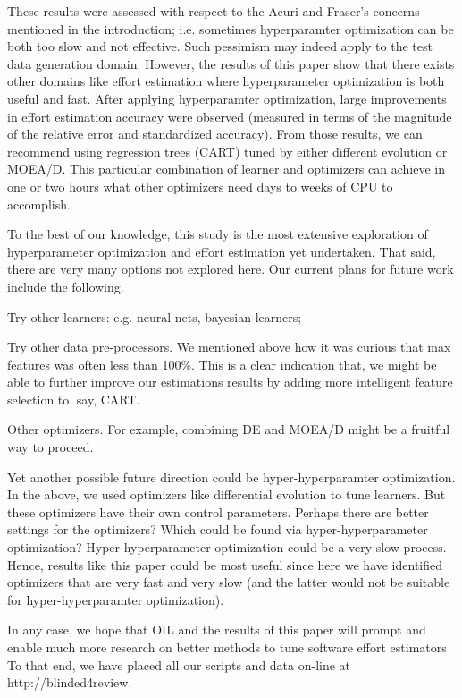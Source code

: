 These results were assessed with respect to the  Acuri and  Fraser's concerns mentioned in the introduction; i.e. sometimes
hyperparamter optimization can be both too slow and not effective.
Such pessimism    may indeed apply  to  the  test  data  generation  domain.
However, 
the results of this paper show that 
 there  exists
other domains like effort estimation where hyperparameter
optimization  is  both
useful
and
fast. After  applying  hyperparamter optimization,  large  improvements  in  effort
estimation  accuracy  were  observed  (measured  in  terms  of  the
magnitude  of  the  relative  error  and  standardized  accuracy).
From those results, we can recommend using regression trees
(CART)  tuned  by  either  different  evolution  or  MOEA/D.  This
particular combination of learner and optimizers can achieve
in  one  or  two  hours  what  other  optimizers  need  days  to  weeks
of  CPU  to  accomplish.

To the best of our knowledge,
this study is the most extensive exploration   of
hyperparameter optimization and effort estimation yet undertaken. That said, there are very many
options not explored here. Our current
plans for future work include the following.
\bi
\item Try other learners:
e.g. neural nets, bayesian learners;
\item Try other data pre-processors.
We mentioned above how it was curious that
max features was often less than 100\%.
This is a clear indication that, we
might be able to further improve our estimations results by adding
more intelligent feature selection to, say, CART.
\item Other optimizers. For example,
combining DE and MOEA/D might be a fruitful way
to proceed.
\item Yet another possible future direction
could be hyper-hyperparamter optimization. In
the above, we used optimizers like differential
evolution to tune learners. But these optimizers
have their own control parameters. Perhaps there 
are better settings for the optimizers? Which could be found via hyper-hyperparameter optimization?
\ei
Hyper-hyperparameter optimization could be a very slow
process. Hence, results like this paper could be
most useful since here we have identified
optimizers that are
very fast and very slow (and the latter would
not be suitable for hyper-hyperparamter optimization).

In any case,
we  hope  that
OIL  and the results of this paper will  prompt  and  enable
much more research on better methods to tune software effort
estimators
To that end, we have placed all our scripts and data   on-line at http://blinded4review.

